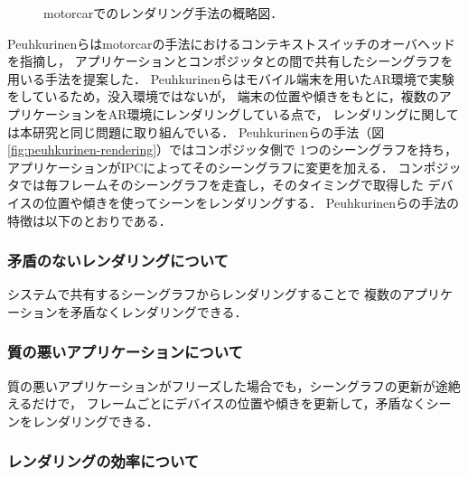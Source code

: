 \begin{figure}[htbp]
  \centering
  \caption{
    motorcar\cite{reiling}でのレンダリング手法の概略図．
  }
  \label{fig:reiling-rendering}
\end{figure}

Peuhkurinenらはmotorcarの手法におけるコンテキストスイッチのオーバヘッドを指摘し，
アプリケーションとコンポジッタとの間で共有したシーングラフを用いる手法を提案した\cite{peuhkurinen}．
Peuhkurinenらはモバイル端末を用いたAR環境で実験をしているため，没入環境ではないが，
端末の位置や傾きをもとに，複数のアプリケーションをAR環境にレンダリングしている点で，
レンダリングに関しては本研究と同じ問題に取り組んでいる．
Peuhkurinenらの手法（図\ref{fig:peuhkurinen-rendering}）ではコンポジッタ側で
1つのシーングラフを持ち，アプリケーションがIPCによってそのシーングラフに変更を加える．
コンポジッタでは毎フレームそのシーングラフを走査し，そのタイミングで取得した
デバイスの位置や傾きを使ってシーンをレンダリングする．
Peuhkurinenらの手法の特徴は以下のとおりである．

\subsubsection*{矛盾のないレンダリングについて}

システムで共有するシーングラフからレンダリングすることで
複数のアプリケーションを矛盾なくレンダリングできる．

\subsubsection*{質の悪いアプリケーションについて}

質の悪いアプリケーションがフリーズした場合でも，シーングラフの更新が途絶えるだけで，
フレームごとにデバイスの位置や傾きを更新して，矛盾なくシーンをレンダリングできる．

\subsubsection*{レンダリングの効率について}

